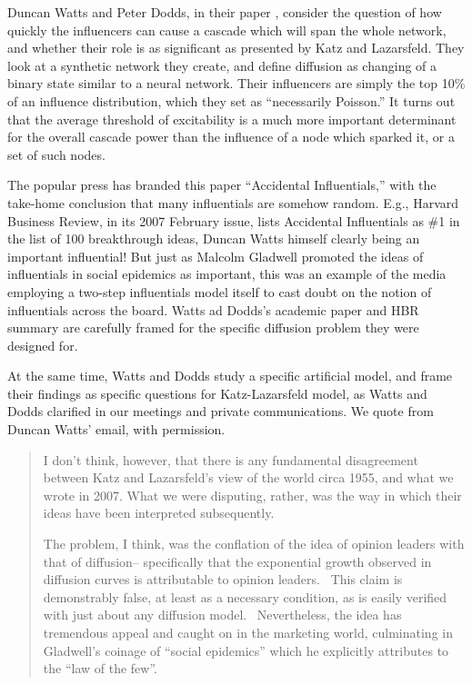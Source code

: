 \documentclass[10pt,oneside]{memoir}
\begin{document}
\begin{Spacing}{2}
Duncan Watts and Peter Dodds, in their paper \cite{watts2007influentials}, consider the question of how quickly the influencers can cause a cascade which will span the whole network, and whether their role is as significant as presented by Katz and Lazarsfeld.  They look at a synthetic network they create, and define diffusion as changing of a binary state similar to a neural network.  Their influencers are simply the top 10\% of an influence distribution, which they set as ``necessarily Poisson.''  It turns out that the average threshold of excitability is a much more important determinant for the overall cascade power than the influence of a node which sparked it, or a set of such nodes.


The popular press has branded this paper ``Accidental Influentials,'' with the take-home conclusion that many influentials are somehow random.  E.g., Harvard Business Review, in its 2007 February issue, lists Accidental Influentials as \#1 in the list of 100 breakthrough ideas, Duncan Watts himself clearly being an important influential!  But just as Malcolm Gladwell promoted the ideas of influentials in social epidemics as important, this was an example of the media employing a two-step influentials model itself to cast doubt on the notion of influentials across the board.  Watts ad Dodds's academic paper and HBR summary are carefully framed for the specific diffusion problem they were designed for.


At the same time, Watts and Dodds study a specific artificial model, and frame their findings as specific questions for Katz-Lazarsfeld model, as Watts and Dodds clarified in our meetings and private communications.  We quote from Duncan Watts' email, with permission.


\begin{quote}
I don't think, however, that there is any fundamental disagreement between Katz and Lazarsfeld's view of the world circa 1955, and what we wrote in 2007. What we were disputing, rather, was the way in which their ideas have been interpreted subsequently. 


The problem, I think, was the conflation of the idea of opinion leaders with that of diffusion-- specifically that the exponential growth observed in diffusion curves is attributable to opinion leaders. ~This claim is demonstrably false, at least as a necessary condition, as is easily verified with just about any diffusion model. ~Nevertheless, the idea has tremendous appeal and caught on in the marketing world, culminating in Gladwell's coinage of ``social epidemics'' which he explicitly attributes to the ``law of the few''. ~



\end{quote}
\end{Spacing}
\end{document}
